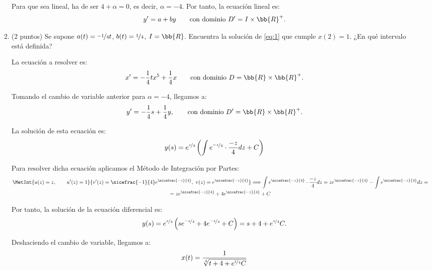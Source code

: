 \documentclass[12pt]{article}
\begin{document}
\begin{ejercicio}[6 puntos]
\begin{enumerate}
        Para que sea lineal, ha de ser $4+\alpha=0$, es decir, $\alpha=-4$. Por tanto, la ecuación lineal es:
        \begin{equation*}
            y'=a+by \qquad \text{con dominio }D'=I\times \bb{R}^+.
        \end{equation*}
        
        \item (2 puntos) Se supone $a(t) = \nicefrac{-1}{4}t$, $b(t) = \nicefrac{1}{4}$, $I = \bb{R}$. Encuentra la solución de \eqref{eq:1} que cumple $x(2) = 1$. ¿En qué intervalo está definida?
        
        La ecuación a resolver es:
        \begin{equation*}
            x'=-\dfrac{1}{4}tx^5+\dfrac{1}{4}x\qquad \text{con dominio }D=\bb{R}\times \bb{R}^+.
        \end{equation*}

        Tomando el cambio de variable anterior para $\alpha=-4$, llegamos a:
        \begin{equation*}
            y'=-\dfrac{1}{4}s+\dfrac{1}{4}y, \qquad \text{con dominio }D'=\bb{R}\times \bb{R}^+.
        \end{equation*}

        La solución de esta ecuación es:
        \begin{equation*}
            y(s)=e^{\nicefrac{s}{4}}\left(\int e^{\nicefrac{-z}{4}}\cdot \frac{-z}{4}dz+C\right)
        \end{equation*}

        Para resolver dicha ecuación aplicamos el Método de Integración por Partes:
        \begin{multline*}
            \MetInt{u(z)=z,\qquad u'(z)=1}{v'(z)=\nicefrac{-1}{4}e^{\nicefrac{-z}{4}},~v(z)=e^{\nicefrac{-z}{4}}}
            \Longrightarrow
            \int e^{\nicefrac{-z}{4}}\cdot \frac{-z}{4}dz=ze^{\nicefrac{-z}{4}}-\int e^{\nicefrac{-z}{4}}dz=\\=ze^{\nicefrac{-z}{4}}+4e^{\nicefrac{-z}{4}}+C
        \end{multline*}

        Por tanto, la solución de la ecuación diferencial es:
        \begin{equation*}
            y(s)=e^{\nicefrac{s}{4}}\left(se^{\nicefrac{-s}{4}}+4e^{\nicefrac{-s}{4}}+C\right)=s+4+e^{\nicefrac{s}{4}}C.
        \end{equation*}

        Deshaciendo el cambio de variable, llegamos a:
        \begin{equation*}
            x(t)=\dfrac{1}{\sqrt[4]{t+4+e^{\nicefrac{t}{4}}C}}
        \end{equation*}


\end{enumerate}
\end{ejercicio}
\end{document}
